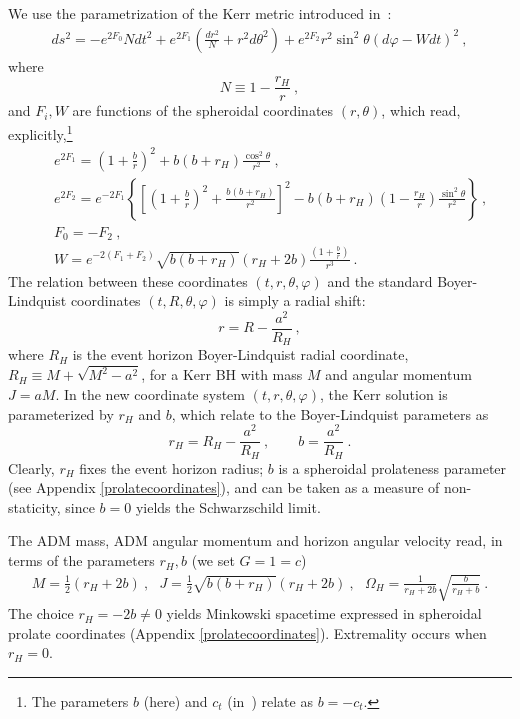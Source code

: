 \documentclass{article}
\numberwithin{equation}{section}
\begin{document}
We use the parametrization of the Kerr metric  introduced in~\cite{Herdeiro:2015gia}: 
\begin{eqnarray}
 ds^2=-e^{2F_0}N dt^2+e^{2F_1}\left(\frac{dr^2}{N}+r^2 d\theta^2\right) + e^{2F_2}r^2 \sin^2\theta \left(d\varphi-W dt\right)^2 \ ,
 \label{kerrnc}
\end{eqnarray}
%
%
where 
\begin{equation}
N\equiv 1 -\frac{r_H}{r} \ ,
\label{n}
\end{equation} 
and  $F_i,W$ are functions of the spheroidal coordinates $(r,\theta)$, which read, explicitly,\footnote{The parameters $b$ (here) and $c_t$ (in~\cite{Herdeiro:2015gia}) relate as $b=-c_t$.}
%
\begin{eqnarray}
\nonumber
&&
e^{2F_1}=\left(1+\frac{b}{r}\right)^2+b(b+r_H)\frac{\cos^2\theta}{r^2}\ ,
\\
\nonumber
&&
e^{2F_2}=e^{-2F_1}
\left\{
          \left[
\left(1+\frac{b}{r}\right)^2+\frac{b(b+r_H)}{r^2}
          \right]^2-b(b+r_H)\left(1-\frac{r_H}{r}\right)\frac{\sin^2\theta}{r^2}
\right\}\ ,
\\
\nonumber
&&
F_0=-F_2 \ , \\
&&
\label{functionsKerr}
\displaystyle{W=e^{-2(F_1+F_2)}
\sqrt{b(b+r_H)}(r_H+2b)
\frac{(1+\frac{b}{r})}{r^3}} \ .
\end{eqnarray}
The relation between these coordinates $(t,r,\theta,\varphi)$ and the standard Boyer-Lindquist coordinates $(t,R,\theta,\varphi)$ is simply a radial shift:
\begin{equation}
r=R-\frac{a^2}{R_H} \ , 
\end{equation}
where $R_H$ is the event horizon Boyer-Lindquist radial coordinate,  $R_H\equiv M+\sqrt{M^2-a^2}$, for a Kerr BH with mass $M$ and angular momentum $J=aM$. In the new coordinate system $(t,r,\theta,\varphi)$, the Kerr solution is parameterized by $r_H$ and $b$, which relate to the Boyer-Lindquist parameters as
\begin{equation}
r_H=R_H-\frac{a^2}{R_H} \ , \qquad b=\frac{a^2}{R_H} \ .
\end{equation}
Clearly, $r_H$ fixes the event horizon radius; $b$ is a spheroidal prolateness parameter (see Appendix \ref{prolatecoordinates}), and can be taken as a measure of non-staticity, since $b=0$ yields the Schwarzschild limit.

The ADM mass, ADM angular momentum and horizon angular velocity read, in terms of the parameters $r_H,b$ (we set $G=1=c$)
\begin{equation}
\begin{array}{c}
M=\frac{1}{2}(r_H+2b) \ , \ \ \ 
J=\frac{1}{2}\sqrt{b(b+r_H)}(r_H+2b) \ , \ \ \
\label{Kerr2}
\displaystyle{\Omega_H=\frac{1}{r_H+2b}\sqrt{\frac{b}{r_H+b}}} \ .
\end{array}
\end{equation}
The choice $r_H=-2b\neq 0$
yields Minkowski spacetime expressed in spheroidal prolate coordinates (Appendix \ref{prolatecoordinates}). Extremality occurs when $r_H=0$.
\end{document}
